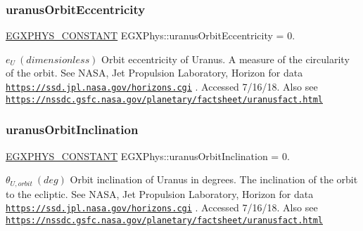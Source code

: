 \subsubsection{\texorpdfstring{uranus\+Orbit\+Eccentricity}{uranusOrbitEccentricity}}
{\footnotesize\ttfamily \mbox{\hyperlink{group___e_g_x_phys-_constants-_macros_ga76980d288494ce1714c9ac68a95ba702}{E\+G\+X\+P\+H\+Y\+S\+\_\+\+C\+O\+N\+S\+T\+A\+NT}} E\+G\+X\+Phys\+::uranus\+Orbit\+Eccentricity = 0.}

$ e_{U} \ (dimensionless)$ Orbit eccentricity of Uranus. A measure of the circularity of the orbit. See N\+A\+SA, Jet Propulsion Laboratory, Horizon for data \href{https://ssd.jpl.nasa.gov/horizons.cgi}{\tt https\+://ssd.\+jpl.\+nasa.\+gov/horizons.\+cgi} . Accessed 7/16/18. Also see \href{https://nssdc.gsfc.nasa.gov/planetary/factsheet/uranusfact.html}{\tt https\+://nssdc.\+gsfc.\+nasa.\+gov/planetary/factsheet/uranusfact.\+html} \mbox{\label{group___e_g_x_phys-_constants-_astrophysics-_solar_system-_uranus-_orbit_ga52ecbdab9b82b86f84905cbd0048f75b}} 
\subsubsection{\texorpdfstring{uranus\+Orbit\+Inclination}{uranusOrbitInclination}}
{\footnotesize\ttfamily \mbox{\hyperlink{group___e_g_x_phys-_constants-_macros_ga76980d288494ce1714c9ac68a95ba702}{E\+G\+X\+P\+H\+Y\+S\+\_\+\+C\+O\+N\+S\+T\+A\+NT}} E\+G\+X\+Phys\+::uranus\+Orbit\+Inclination = 0.}

$ \theta_{U,orbit} \ (deg)$ Orbit inclination of Uranus in degrees. The inclination of the orbit to the ecliptic. See N\+A\+SA, Jet Propulsion Laboratory, Horizon for data \href{https://ssd.jpl.nasa.gov/horizons.cgi}{\tt https\+://ssd.\+jpl.\+nasa.\+gov/horizons.\+cgi} . Accessed 7/16/18. Also see \href{https://nssdc.gsfc.nasa.gov/planetary/factsheet/uranusfact.html}{\tt https\+://nssdc.\+gsfc.\+nasa.\+gov/planetary/factsheet/uranusfact.\+html} \mbox{\label{group___e_g_x_phys-_constants-_astrophysics-_solar_system-_uranus-_orbit_ga74776252e25eeb9c02bc5a69087888b5}} 
